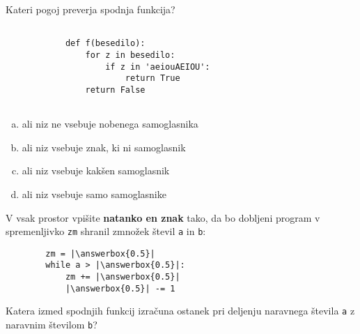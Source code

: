 \documentclass[arhiv, 10pt]{../izpit}
\newcommand{\inlinepy}[1]{\texttt{#1}}
\newcommand{\answerbox}[1]{\framebox{\vphantom{\large M}\hspace{#1cm}}}
\begin{document}
        \naloga*

        \begin{multicols}{2}
        \noindent
        Kateri pogoj preverja spodnja funkcija?
        \begin{verbatim}
        
            def f(besedilo):
                for z in besedilo:
                    if z in 'aeiouAEIOU':
                        return True
                return False
            
        \end{verbatim}

        \begin{enumerate}[(a)]
\item ali niz ne vsebuje nobenega samoglasnika
\item ali niz vsebuje znak, ki ni samoglasnik
\item ali niz vsebuje kakšen samoglasnik
\item ali niz vsebuje samo samoglasnike
\end{enumerate}

        \end{multicols}
    
        \naloga*
        \begin{multicols}{2}
        \noindent
        V vsak prostor vpišite \textbf{natanko en znak} tako, da bo dobljeni program v spremenljivko \inlinepy{zm} shranil zmnožek števil \inlinepy{a} in \inlinepy{b}:
        
        \columnbreak
        \begin{verbatim}
        zm = |\answerbox{0.5}|
        while a > |\answerbox{0.5}|:
            zm += |\answerbox{0.5}|
            |\answerbox{0.5}| -= 1
        \end{verbatim}
        \end{multicols}
    
        \clearpage
        \naloga
        
        Katera izmed spodnjih funkcij izračuna ostanek pri deljenju naravnega števila \inlinepy{a} z naravnim številom \inlinepy{b}?
    
\end{document}
